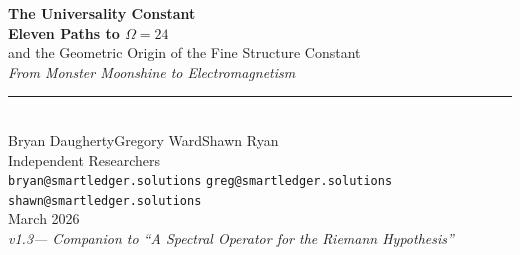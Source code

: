 \documentclass[11pt,a4paper]{article}
\theoremstyle{plain}
\theoremstyle{remark}
\renewcommand{\Omega}{\varOmega}
\begin{document}
\thispagestyle{empty}


\vspace*{0.5cm}

\begin{center}
  {\fontsize{22}{26}\selectfont\bfseries\color{accent}
   The Universality Constant\\[2pt]
   Eleven Paths to $\Omega = 24$}\\[10pt]
  {\large\color{accentlight}
   and the Geometric Origin of the Fine Structure Constant\\[2pt]
   \itshape From Monster Moonshine to Electromagnetism}\\[20pt]
  {\color{titlegold}\rule{6cm}{0.8pt}}\\[20pt]
  {\Large Bryan Daugherty\qquad Gregory Ward\qquad Shawn Ryan}\\[8pt]
  {\small\color{subtlegray}
    Independent Researchers\\[4pt]
    \texttt{bryan@smartledger.solutions}\quad
    \texttt{greg@smartledger.solutions}\quad
    \texttt{shawn@smartledger.solutions}}\\[16pt]
  {\normalsize\color{subtlegray} March 2026}\\[6pt]
  {\small\color{subtlegray}\itshape v1.3\enspace---\enspace
    Companion to ``A Spectral Operator for the Riemann Hypothesis'' \cite{DHR2026a}}
\end{center}

\vspace{14pt}

\noindent
{}

\vspace{10pt}
\end{document}
